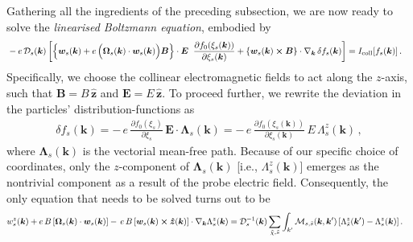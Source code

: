 \documentclass[aps,prb,onecolumn,nofootinbib,citeautoscript,10pt, showkeys]{revtex4-2}
\begin{document}
Gathering all the ingredients of the preceding subsection, we are now ready to solve the \textit{linearised Boltzmann equation}, embodied by
\begin{align}
\label{eqkin5}
& - e\, {\mathcal D}_s ({\boldsymbol k})
 \left [
\left \lbrace {\boldsymbol{w}}_s ({\boldsymbol k})
+ e \,\Big(
{\boldsymbol \Omega}_s ({\boldsymbol k}) 
\cdot {\boldsymbol{w}}_s   ({\boldsymbol k}) \Big )  \boldsymbol B \right \rbrace
\cdot {\boldsymbol E}  
\; \;	\frac{\partial  f_0 (\xi_s({\boldsymbol k})) }
 {\partial \xi_s({\boldsymbol k}) }
+  
\left \lbrace   {\boldsymbol{w}}_s ({\boldsymbol k})
\cross  {\boldsymbol B}  \right \rbrace
\cdot \nabla_{\boldsymbol k}
\, \delta f_s (\boldsymbol k) \right] 
 =  I_{\text{coll}} [f_s ({\boldsymbol k})] \,.
\end{align}
Specifically, we choose the collinear electromagnetic fields to act along the $z$-axis, such that $\boldsymbol B  =  B\, \boldsymbol{\hat{z}}$ and $ \boldsymbol E  =  E\, \boldsymbol{\hat{z}}$.
To proceed further, we rewrite the deviation in the particles' distribution-functions as
\begin{align}
\label{eqansatz}
	\delta f_s (\boldsymbol {k}) =
-\,	 e\, 	\frac{\partial  f_0 (\xi_s) } {\partial \xi_s } 
	\,   {\boldsymbol E}  \cdot \bm{\Lambda}_s (\boldsymbol {k} )
=
-\,	 e\, 	\frac{\partial  f_0 (\xi_s({\boldsymbol k})) }
 {\partial \xi_s ({\boldsymbol k})} 
	\,   E \, {\Lambda}^z_s ( \boldsymbol {k} ) \,,
\end{align}
where $ \bm{\Lambda}_s (\boldsymbol {k} ) $ is the vectorial mean-free path. Because of our specific choice of coordinates, only the $z$-component of $ \bm{\Lambda}_s ( \boldsymbol {k} ) $ [i.e., $ {\Lambda}^z_s (\boldsymbol {k} )  $] emerges as the nontrivial component as a result of the probe electric field. Consequently, the only equation that needs to be solved turns out to be
\begin{align}
\label{eqvec}
&  w^z_s ({\boldsymbol k})
+ e \, B \left [
{\boldsymbol \Omega}_{s} ({\boldsymbol k})
 \cdot {\boldsymbol{w}}_s ({\boldsymbol k})  \right ]
-\, 
e \, B \left [ {\boldsymbol{w}}_s ({\boldsymbol k}) \cross   
\boldsymbol{\hat z}  ({\boldsymbol k}) \right ] 
\cdot \nabla_{\boldsymbol k} {\Lambda}^z_s (\boldsymbol {k} )  
 = {\mathcal D}^{-1}_s  ({\boldsymbol k})
\sum \limits_{\tilde \chi, \tilde s}
\int_{k'}
\mathcal{M}_{ s, \tilde s} (\boldsymbol k,\boldsymbol k^\prime)
\left[ 
 {\Lambda}^z_{\tilde s} (\boldsymbol {k}^\prime ) 
 -  {\Lambda}^z_s (\boldsymbol {k} )  \right ].
\end{align}
\end{document}
